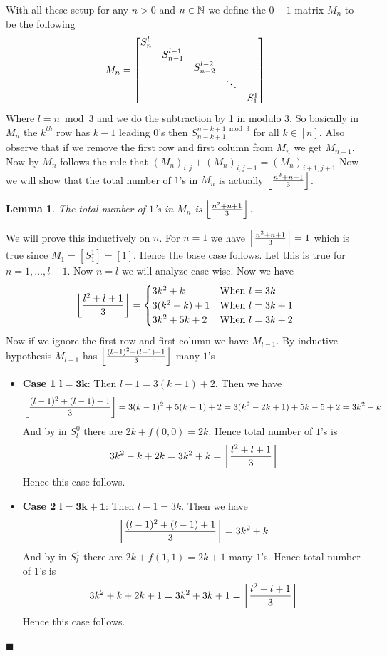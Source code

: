 \documentclass[a4paper, 11pt]{article}
\newtheorem{lemma}{Lemma}
\renewenvironment{proof}{\noindent{\it \textbf{Proof:}}\hspace*{1em}}{\hfill $\blacksquare$\bigskip\\}
\begin{document}
{With all these setup for any $n>0$ and $n\in\mathbb{N}$ we define the $0-1$ matrix $M_n$ to be the following 
$$M_n=\left[\begin{matrix}S_n^{l}\\
&S_{n-1}^{l-1}\\
&& S_{n-2}^{l-2}\\
&&&\ddots \\ &&&&S_1^1 \end{matrix}\right]$$Where $l=n\bmod 3$ and we do the subtraction by 1 in modulo 3. So basically in $M_n$ the $k^{th}$ row  has $k-1$ leading $0$'s then  $S_{n-k+1}^{n-k+1\bmod 3}$ for all $k\in[n]$.  Also observe that if we remove the first row and first column from $M_n$ we get $M_{n-1}$. Now by  $M_n$ follows the rule that $(M_n)_{i,j}+(M_n)_{i,j+1}= (M_n)_{i+1,j+1}$ Now we will show that the total number of $1$'s in $M_n$ is actually $\left\lfloor \frac{n^2+n+1}{3}\right\rfloor$. 
\begin{lemma}
	The total number of $1$'s in $M_n$ is $\left\lfloor \frac{n^2+n+1}{3}\right\rfloor$.
\end{lemma}
\begin{proof}
	We will prove this inductively on $n$. For $n=1$ we have $\left\lfloor \frac{n^2+n+1}{3}\right\rfloor=1$ which is true since $M_1=[S_1^1]=[1]$. Hence the base case follows. Let this is true for $n=1,\dots, l-1$. Now $n=l$ we will analyze case wise. 	Now we have $$\left\lfloor \frac{l^2+l+1}{3}\right\rfloor =\begin{cases}
		3k^2+k& \text{When $l=3k$}\\ 3(k^2+k)+1 & \text{When $l=3k+1$}\\ 3k^2+5k+2 & \text{When $l=3k+2$}
	\end{cases}$$Now if we ignore the first row and first column we have $M_{l-1}$. By inductive hypothesis $M_{l-1}$ has $\left\lfloor \frac{(l-1)^2+(l-1)+1}{3}\right\rfloor$ many $1$'s 
	\begin{itemize}[label=$\bullet$]
		\item \textbf{Case 1} $\boldsymbol{l=3k}$: Then $l-1=3(k-1)+2$. Then we have $$\left\lfloor \frac{(l-1)^2+(l-1)+1}{3}\right\rfloor=3(k-1)^2+5(k-1)+2=3(k^2-2k+1)+5k-5+2=3k^2-k$$And by  in $S_l^0$ there are $2k+f(0,0)=2k$. Hence total number of $1$'s is $$3k^2-k+2k=3k^2+k=\left\lfloor \frac{l^2+l+1}{3}\right\rfloor$$Hence this case follows.
		\item \textbf{Case 2} $\boldsymbol{l=3k+1}$: Then $l-1=3k$. Then we have $$\left\lfloor \frac{(l-1)^2+(l-1)+1}{3}\right\rfloor=3k^2+k$$And by  in $S_l^1$ there are $2k+f(1,1)=2k+1$ many $1$'s. Hence total number of $1$'s is $$3k^2+k+2k+1=3k^2+3k+1=\left\lfloor \frac{l^2+l+1}{3}\right\rfloor$$Hence this case follows.

\end{itemize}
\end{proof}}
\end{document}
